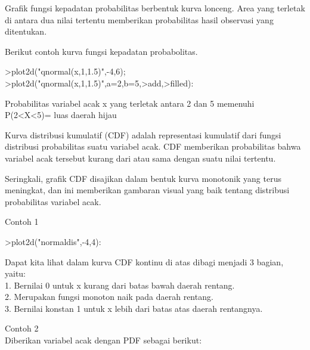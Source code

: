 \documentclass{article}
\begin{document}
\begin{eulernotebook}
\begin{eulercomment}
\begin{eulercomment}
\begin{eulercomment}
\begin{eulercomment}
\begin{eulercomment}
Grafik fungsi kepadatan probabilitas berbentuk kurva lonceng. Area
yang terletak di antara dua nilai tertentu memberikan probabilitas
hasil observasi yang ditentukan.

Berikut contoh kurva fungsi kepadatan probabolitas.
\end{eulercomment}
\begin{eulerprompt}
>plot2d("qnormal(x,1,1.5)",-4,6);
>plot2d("qnormal(x,1,1.5)",a=2,b=5,>add,>filled):
\end{eulerprompt}
\begin{eulercomment}
Probabilitas variabel acak x yang terletak antara 2 dan 5 memenuhi\\
P(2\textless{}X\textless{}5)= luas daerah hijau
\end{eulercomment}
\begin{eulercomment}
Kurva distribusi kumulatif (CDF) adalah representasi kumulatif dari
fungsi distribusi probabilitas suatu variabel acak. CDF memberikan
probabilitas bahwa variabel acak tersebut kurang dari atau sama dengan
suatu nilai tertentu.

Seringkali, grafik CDF disajikan dalam bentuk kurva monotonik yang
terus meningkat, dan ini memberikan gambaran visual yang baik tentang
distribusi probabilitas variabel acak.

\end{eulercomment}
\begin{eulercomment}
Contoh 1
\end{eulercomment}
\begin{eulerprompt}
>plot2d("normaldis",-4,4): 
\end{eulerprompt}
\begin{eulercomment}
Dapat kita lihat dalam kurva CDF kontinu di atas dibagi menjadi 3
bagian, yaitu:\\
1. Bernilai 0 untuk x kurang dari batas bawah daerah rentang.\\
2. Merupakan fungsi monoton naik pada daerah rentang.\\
3. Bernilai konstan 1 untuk x lebih dari batas atas daerah rentangnya.

Contoh 2\\
Diberikan variabel acak dengan PDF sebagai berikut:


\end{eulercomment}
\end{eulercomment}
\end{eulercomment}
\end{eulercomment}
\end{eulercomment}
\end{eulernotebook}
\end{document}
